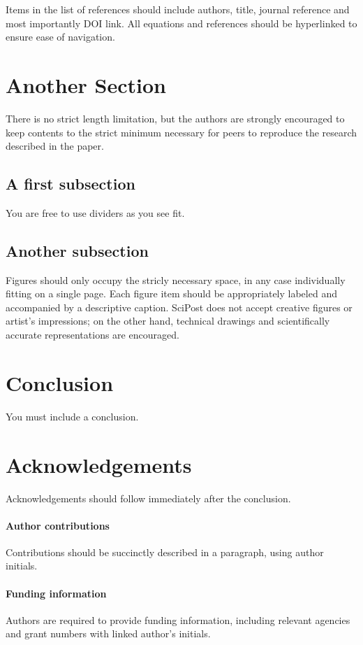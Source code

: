 \documentclass[submission]{SciPost}
\begin{document}
Items in the list of references\cite{1931_Bethe_ZP_71} should include authors, title, journal reference and most importantly DOI link. All equations and references should be hyperlinked to ensure ease of navigation.

\section{Another Section}
There is no strict length limitation, but the authors are strongly encouraged to keep contents to the strict minimum necessary for peers to reproduce the research described in the paper.

\subsection{A first subsection}
You are free to use dividers as you see fit.
\subsection{Another subsection}
Figures should only occupy the stricly necessary space, in any case individually fitting on a single page. Each figure item should be appropriately labeled and accompanied by a descriptive caption. SciPost does not accept creative figures or artist's impressions; on the other hand, technical drawings and scientifically accurate representations are encouraged.


\section{Conclusion}
You must include a conclusion.

\section*{Acknowledgements}
Acknowledgements should follow immediately after the conclusion. 

\paragraph{Author contributions}
Contributions should be succinctly described in a paragraph, using author initials.

\paragraph{Funding information}
Authors are required to provide funding information, including relevant agencies and grant numbers with linked author's initials.
\end{document}
